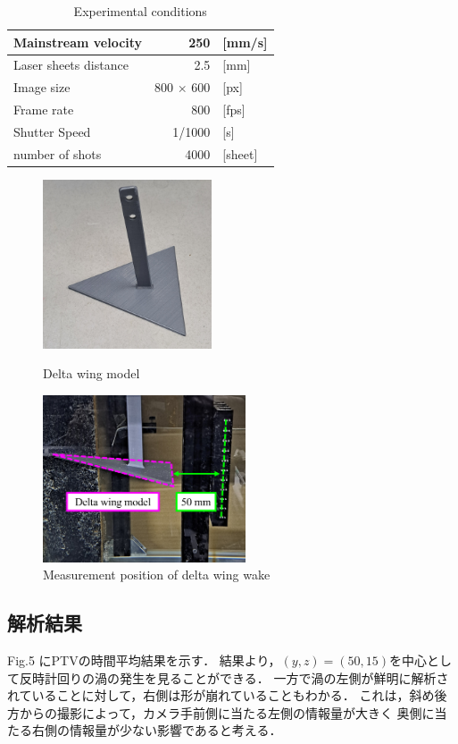 \documentclass[twocolumn,a4j]{jsarticle}
\begin{document}
\begin{table}[h]
  \label{table:data_type}
  \centering
  \caption{Experimental conditions}
  \begin{tabular}{| l | r | l |}
    \hline
    Mainstream velocity   & 250              & [mm/s]  \\ \hline
    Laser sheets distance & 2.5              & [mm]    \\ \hline
    Image size            & 800 $\times$ 600 & [px]    \\ \hline
    Frame rate            & 800              & [fps]   \\ \hline
    Shutter Speed         & 1/1000           & [s]     \\ \hline
    number of shots       & 4000             & [sheet] \\ \hline
  \end{tabular}
\end{table}

\begin{figure}[htbp]
  \footnotesize
  \begin{center}
    \includegraphics[width=50mm]{../images/delta_wing_model.jpg}
    \caption{Delta wing model}
    \includegraphics[width=60mm]{../images/delta_wing_position.png}
    \caption{Measurement position of delta wing wake}
  \end{center}
\end{figure}

\newpage

\subsection{解析結果}
Fig.5 にPTVの時間平均結果を示す．
結果より，$(y,z) = (50, 15)$を中心として反時計回りの渦の発生を見ることができる．
一方で渦の左側が鮮明に解析されていることに対して，右側は形が崩れていることもわかる．
これは，斜め後方からの撮影によって，カメラ手前側に当たる左側の情報量が大きく
奥側に当たる右側の情報量が少ない影響であると考える．
\end{document}
